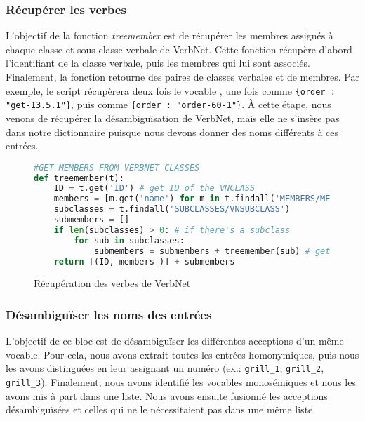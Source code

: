 \subsubsection{Récupérer les verbes}
L'objectif de la fonction \emph{treemember} est de récupérer les membres assignés à chaque classe et sous-classe verbale de VerbNet. Cette fonction récupère d'abord l'identifiant de la classe verbale, puis les membres qui lui sont associés. Finalement, la fonction retourne des paires de classes verbales et de membres. Par exemple, le script récupèrera deux fois le vocable , une fois comme \lstinline|{order : "get-13.5.1"}|, puis comme \lstinline|{order : "order-60-1"}|. À cette étape, nous venons de récupérer la désambiguïsation de VerbNet, mais elle ne s'insère pas dans notre dictionnaire puisque nous devons donner des noms différents à ces entrées.

\begin{figure}[htb]
  \caption{Récupération des verbes de VerbNet}
	\label{fig:scriptmember-bloc1}
\begin{lstlisting}[language=Python]
#GET MEMBERS FROM VERBNET CLASSES
def treemember(t):
    ID = t.get('ID') # get ID of the VNCLASS
    members = [m.get('name') for m in t.findall('MEMBERS/MEMBER')] # get members 
    subclasses = t.findall('SUBCLASSES/VNSUBCLASS')
    submembers = []
    if len(subclasses) > 0: # if there's a subclass
        for sub in subclasses:
            submembers = submembers + treemember(sub) # get ID of the subclass and members
    return [(ID, members )] + submembers
\end{lstlisting}
\end{figure}

\subsubsection{Désambiguïser les noms des entrées}

L'objectif de ce bloc est de désambiguïser les différentes acceptions d'un même vocable. Pour cela, nous avons extrait toutes les entrées homonymiques, puis nous les avons distinguées en leur assignant un numéro (ex.: \texttt{grill\_1}, \texttt{grill\_2}, \texttt{grill\_3}). Finalement, nous avons identifié les vocables monosémiques et nous les avons mis à part dans une liste. Nous avons ensuite fusionné les acceptions désambiguïsées et celles qui ne le nécessitaient pas dans une même liste.

